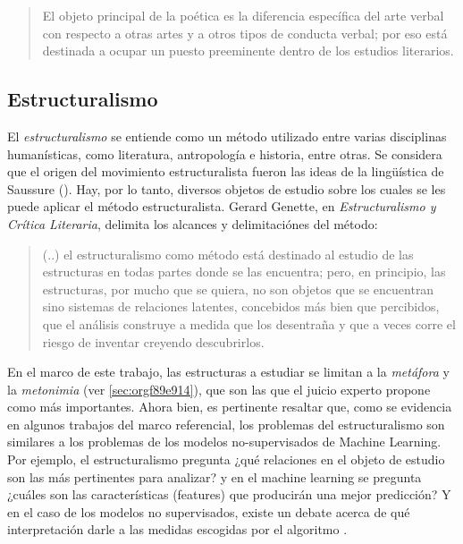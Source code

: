\documentclass[12pt,letterpaper,twoside]{article}
\begin{document}
\begin{quote}
El objeto principal de la poética es la diferencia específica del
arte verbal con respecto a otras artes y a otros tipos de conducta
verbal; por eso está destinada a ocupar un puesto preeminente dentro
de los estudios literarios.\cite[pg. 121]{jakobson1981linguistica}
\end{quote}



\subsection{Estructuralismo}
\label{sec:org11edf5f}

El \emph{estructuralismo} se entiende como un método utilizado entre
varias disciplinas humanísticas, como literatura, antropología e
historia, entre otras.  Se considera que el origen del movimiento
estructuralista fueron las ideas de la lingüística de Saussure
(). Hay, por lo tanto, diversos objetos de estudio
sobre los cuales se les puede aplicar el método estructuralista.
Gerard Genette, en \emph{Estructuralismo y Crítica Literaria}, delimita
los alcances y delimitaciónes del método:

\begin{quote}
 (..) el estructuralismo como método está destinado al estudio de las
estructuras en todas partes donde se las encuentra; pero, en
principio, las estructuras, por mucho que se quiera, no son objetos
que se encuentran sino sistemas de relaciones latentes, concebidos más
bien que percibidos, que el análisis construye a medida que los
desentraña y que a veces corre el riesgo de inventar creyendo
descubrirlos.  \cite[pg. 145]{genette1996estructuralismo}
\end{quote}

En el marco de este trabajo, las estructuras a estudiar se limitan
a la \emph{metáfora} y la \emph{metonimia} (ver \ref{sec:orgf89e914}), que son
las que el juicio experto propone como más importantes. Ahora
bien, es pertinente resaltar que, como se evidencia en algunos
trabajos del marco referencial, los problemas del estructuralismo
son similares a los problemas de los modelos no-supervisados de
Machine Learning. Por ejemplo, el estructuralismo pregunta ¿qué
relaciones en el objeto de estudio son las más pertinentes para
analizar? y en el machine learning se pregunta ¿cuáles son las
características (features) que producirán una mejor predicción? Y
en el caso de los modelos no supervisados, existe un debate acerca
de qué interpretación darle a las medidas escogidas por el
algoritmo \cite{van2019vector}.
\end{document}
